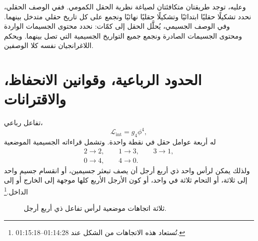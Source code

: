 \begin{classroomqa}
\end{classroomqa}

وعليه، توجد طريقتان متكافئتان لصياغة نظرية الحقل الكمومي. ففي الوصف الحقلي، نحدد تشكيلًا حقليًا ابتدائيًا وتشكيلًا حقليًا نهائيًا ونجمع على كل تاريخ حقلي متدخل بينهما. وفي الوصف الجسيمي، يُحلَّل الحقل إلى كمّات: نحدد محتوى الجسيمات الواردة ومحتوى الجسيمات الصادرة ونجمع جميع التواريخ الجسيمية التي تصل بينهما. ويحكم اللاغرانجيان نفسه كلا الوصفين.

\section{الحدود الرباعية، وقوانين الانحفاظ، والاقترانات}

تفاعل رباعي،
\begin{equation}
\mathcal{L}_{\mathrm{int}}=g_4\phi^4,
\end{equation}
له أربعة عوامل حقل في نقطة واحدة. وتشمل قراءاته الجسيمية الموضعية
\begin{equation}
\begin{gathered}
2\longrightarrow2,
\qquad
1\longrightarrow3,
\qquad
3\longrightarrow1,\\
0\longrightarrow4,
\qquad
4\longrightarrow0.
\end{gathered}
\end{equation}
ولذلك يمكن لرأس واحد ذي أربع أرجل أن يصف تبعثر جسيمين، أو انقسام جسيم واحد إلى ثلاثة، أو التحام ثلاثة في واحد، أو كون الأرجل الأربع كلها موجهة إلى الخارج أو إلى الداخل.\footnote{تُستعاد هذه الاتجاهات من الشكل عند 01:14:28--01:15:18.}

\begin{figure}[htbp]
\centering
{}
\caption{ثلاثة اتجاهات موضعية لرأس تفاعل ذي أربع أرجل.}
\end{figure}

